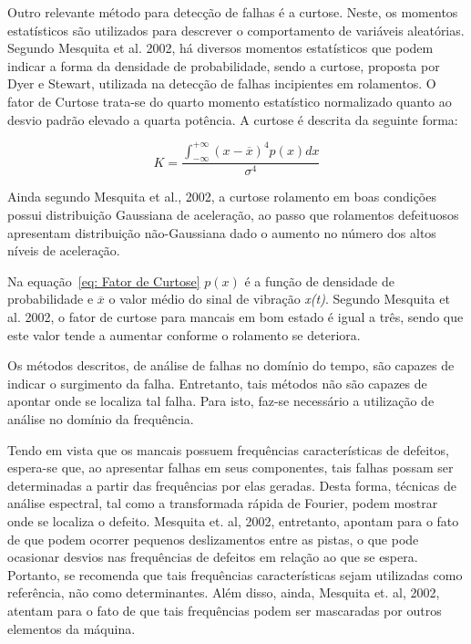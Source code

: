 \documentclass[
	12pt,				
	oneside,			
	a4paper,			
	english,			
	brazil,			
	]{abntex2ppgsi}
\begin{document}
Outro relevante método para detecção de falhas é a curtose. Neste, os momentos estatísticos são utilizados para descrever o comportamento de variáveis aleatórias. Segundo Mesquita et al. 2002, há diversos momentos estatísticos que podem indicar a forma da densidade de probabilidade, sendo a curtose, proposta por Dyer e Stewart, utilizada na detecção de falhas incipientes em rolamentos. O fator de Curtose trata-se do quarto momento estatístico normalizado quanto ao desvio padrão elevado a quarta potência. A curtose é descrita da seguinte forma:

\begin{equation}
	K = \frac{ \int_{-\infty}^{+\infty} (x - \overline{x})^{4}p(x)dx } {\sigma^{4}}
	\label{eq: Fator de Curtose}
\end{equation}

Ainda segundo Mesquita et al., 2002, a curtose rolamento em boas condições possui distribuição Gaussiana de aceleração, ao passo que rolamentos defeituosos apresentam distribuição não-Gaussiana dado o aumento no número dos altos níveis de aceleração. 


Na equação~\ref{eq: Fator de Curtose} $p(x)$ é a função de densidade de probabilidade e $\overline{x}$ o valor médio do sinal de vibração \textit{x(t)}. Segundo Mesquita et al. 2002, o fator de curtose para mancais em bom estado é igual a três, sendo que este valor tende a aumentar conforme o rolamento se deteriora. 

Os métodos descritos, de análise de falhas no domínio do tempo, são capazes de indicar o surgimento da falha. Entretanto, tais métodos não são capazes de apontar onde se localiza tal falha. Para isto, faz-se necessário a utilização de análise no domínio da frequência. 

Tendo em vista que os mancais possuem frequências características de defeitos, espera-se que, ao apresentar falhas em seus componentes, tais falhas possam ser determinadas a partir das frequências por elas geradas. Desta forma, técnicas de análise espectral, tal como a transformada rápida de Fourier, podem mostrar onde se localiza o defeito. Mesquita et. al, 2002, entretanto, apontam para o fato de que podem ocorrer pequenos deslizamentos entre as pistas, o que pode ocasionar desvios nas frequências de defeitos em relação ao que se espera. Portanto, se recomenda que tais frequências características sejam utilizadas como referência, não como determinantes. Além disso, ainda, Mesquita et. al, 2002, atentam para o fato de que tais frequências podem ser mascaradas por outros elementos da máquina.
\end{document}
